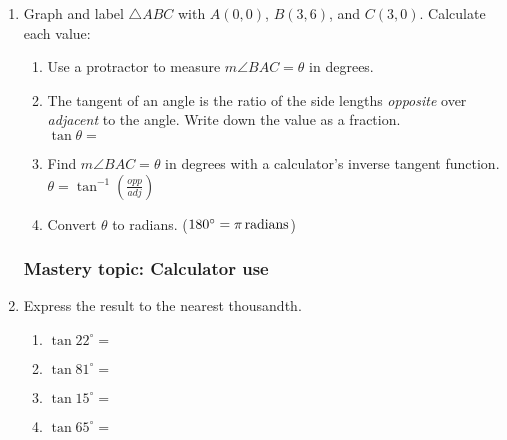 \documentclass[12pt, twoside]{article}
\begin{document}
\begin{enumerate}
\newpage
\item Graph and label $\triangle ABC$ with $A(0,0)$, $B(3,6)$, and $C(3,0)$. Calculate each value:
  \begin{enumerate}[itemsep=1.25cm]  
    \item Use a protractor to measure $m\angle BAC= \theta$ in degrees.
    \item The tangent of an angle is the ratio of the side lengths \emph{opposite} over \emph{adjacent} to the angle. Write down the value as a fraction.\\[0.5cm]
      $\tan  \theta=$
    \item Find $m\angle BAC=\theta$ in degrees with a calculator's inverse tangent function.\\ $\displaystyle \theta = \tan^{-1}(\frac{opp}{adj})$
    \item Convert $ \theta$ to radians. ($180^\circ=\pi \, \rm{radians}$)
  \end{enumerate}

\newpage
\subsubsection*{Mastery topic: Calculator use}
  \item Express the result to the nearest thousandth. \vspace{.5cm}
    \begin{multicols}{2}
      \begin{enumerate}
        \item $\tan 22^\circ = $ \vspace{1cm}
        \item $\tan 81^\circ =$
        \item $\tan 15^\circ = $ \vspace{1cm}
        \item $\tan 65^\circ =$
      \end{enumerate}
    \end{multicols} \vspace{1cm}


\end{enumerate}
\end{document}
